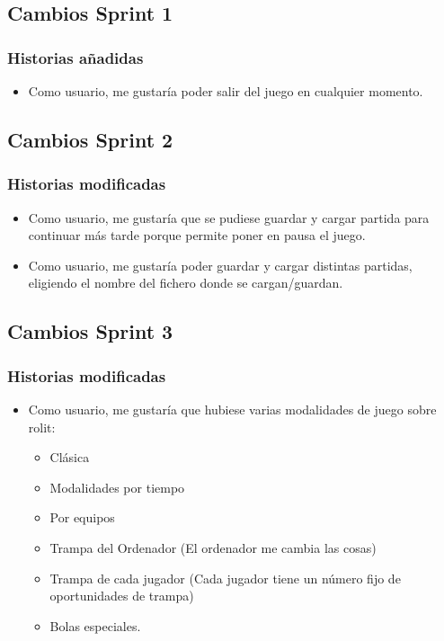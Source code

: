 \documentclass[../../SCRUM.tex]{subfiles}
\begin{document}
\subsection{Cambios Sprint 1}
\subsubsection*{Historias añadidas}
\begin{itemize}
\item
  Como usuario, me gustaría poder salir del juego en cualquier momento.
\end{itemize}

\subsection{Cambios Sprint 2}
\subsubsection*{Historias modificadas}
\begin{itemize}
\item
   Como usuario, me gustaría que se pudiese guardar y
  cargar partida para continuar más tarde porque permite poner en pausa
  el juego.{}
\item
  Como usuario, me gustaría poder guardar y cargar distintas partidas,
  eligiendo el nombre del fichero donde se cargan/guardan.
\end{itemize}

\subsection{Cambios Sprint 3}
\subsubsection*{Historias modificadas}

\begin{itemize}
\item
  Como usuario, me gustaría que hubiese varias modalidades de juego
  sobre rolit:

  \begin{itemize}
  \item
    Clásica
  \item
     Modalidades por tiempo{}
  \item
    Por equipos
  \item
     Trampa del Ordenador (El ordenador me cambia las
    cosas)
  \item
     Trampa de cada jugador (Cada jugador tiene un número
    fijo de oportunidades de trampa)
  \item
     Bolas especiales.
  \end{itemize}
\end{itemize}
\end{document}
